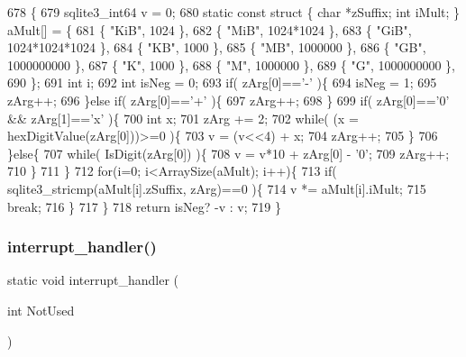 \begin{DoxyCode}
678                                                    \{
679   sqlite3_int64 v = 0;
680   \textcolor{keyword}{static} \textcolor{keyword}{const} \textcolor{keyword}{struct }\{ \textcolor{keywordtype}{char} *zSuffix; \textcolor{keywordtype}{int} iMult; \} aMult[] = \{
681     \{ \textcolor{stringliteral}{"KiB"}, 1024 \},
682     \{ \textcolor{stringliteral}{"MiB"}, 1024*1024 \},
683     \{ \textcolor{stringliteral}{"GiB"}, 1024*1024*1024 \},
684     \{ \textcolor{stringliteral}{"KB"},  1000 \},
685     \{ \textcolor{stringliteral}{"MB"},  1000000 \},
686     \{ \textcolor{stringliteral}{"GB"},  1000000000 \},
687     \{ \textcolor{stringliteral}{"K"},   1000 \},
688     \{ \textcolor{stringliteral}{"M"},   1000000 \},
689     \{ \textcolor{stringliteral}{"G"},   1000000000 \},
690   \};
691   \textcolor{keywordtype}{int} i;
692   \textcolor{keywordtype}{int} isNeg = 0;
693   \textcolor{keywordflow}{if}( zArg[0]==\textcolor{charliteral}{'-'} )\{
694     isNeg = 1;
695     zArg++;
696   \}\textcolor{keywordflow}{else} \textcolor{keywordflow}{if}( zArg[0]==\textcolor{charliteral}{'+'} )\{
697     zArg++;
698   \}
699   \textcolor{keywordflow}{if}( zArg[0]==\textcolor{charliteral}{'0'} && zArg[1]==\textcolor{charliteral}{'x'} )\{
700     \textcolor{keywordtype}{int} x;
701     zArg += 2;
702     \textcolor{keywordflow}{while}( (x = hexDigitValue(zArg[0]))>=0 )\{
703       v = (v<<4) + x;
704       zArg++;
705     \}
706   \}\textcolor{keywordflow}{else}\{
707     \textcolor{keywordflow}{while}( IsDigit(zArg[0]) )\{
708       v = v*10 + zArg[0] - \textcolor{charliteral}{'0'};
709       zArg++;
710     \}
711   \}
712   \textcolor{keywordflow}{for}(i=0; i<ArraySize(aMult); i++)\{
713     \textcolor{keywordflow}{if}( sqlite3_stricmp(aMult[i].zSuffix, zArg)==0 )\{
714       v *= aMult[i].iMult;
715       \textcolor{keywordflow}{break};
716     \}
717   \}
718   \textcolor{keywordflow}{return} isNeg? -v : v;
719 \}
\end{DoxyCode}
\mbox{\label{shell_8c_a71739e7821ca0c6515043e841088e88b}} 
\subsubsection{interrupt\+\_\+handler()}
{\footnotesize\ttfamily static void interrupt\+\_\+handler (\begin{DoxyParamCaption}\item[{int}]{Not\+Used }\end{DoxyParamCaption})\hspace{0.3cm}{\ttfamily [static]}}



